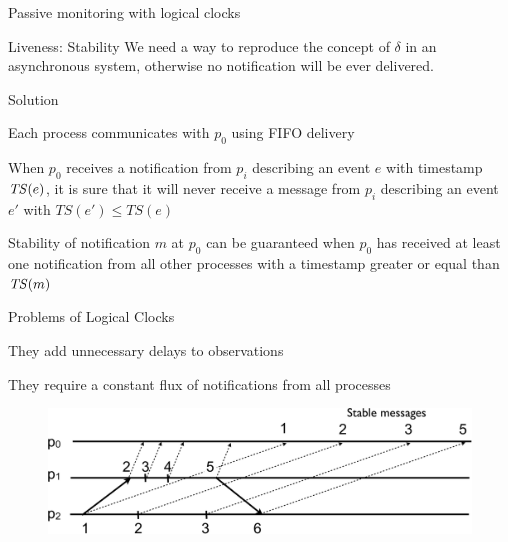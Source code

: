 \begin{frame}{Passive monitoring with logical clocks}

\begin{block}{Liveness: Stability} We need a way to reproduce the concept
	of $\delta$ in an asynchronous system, otherwise no notification 
	will be ever delivered.
\end{block}

\pause
\begin{block}{Solution}
\BIL
\item Each process communicates with $p_0$ using FIFO delivery
\item When $p_0$ receives a notification from $p_i$ describing an event $e$ 
with timestamp $\mathit{TS}(e)$, it is sure that it will never receive a message
from $p_i$ describing an event $e'$ with $TS(e') \leq TS(e)$
\item Stability of notification $m$ at $p_0$ can be guaranteed when $p_0$ has
received at least one notification from all other processes with a timestamp
greater or equal than $\mathit{TS}(m)$
\EIL
\end{block}

\end{frame}

\begin{frame}{Problems of Logical Clocks}
\BI
\item They add unnecessary delays to observations
\item They require a constant flux of notifications from all processes
\EI

\begin{figure}
	\includegraphics[width=12cm]{figs/03/figura.pdf}
\end{figure}

\end{frame}

% 
% 
% 
%  
% 


